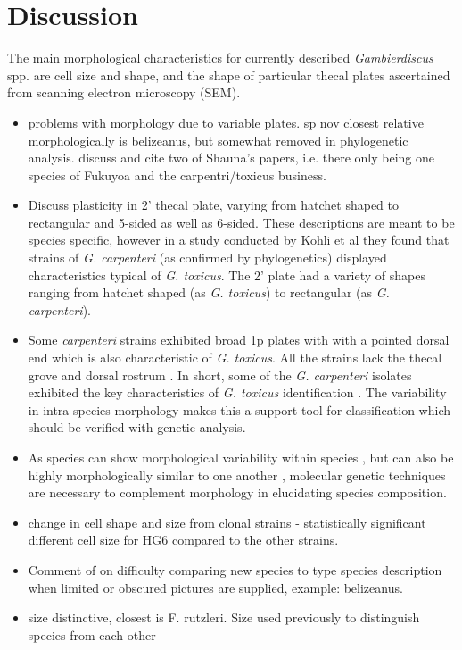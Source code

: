 \documentclass[12pt]{article}
\begin{document}
\section{Discussion}
The main morphological characteristics for currently described \emph{Gambierdiscus} spp. are cell size and shape, and the shape of particular thecal plates ascertained from scanning electron microscopy (SEM).
\begin{itemize}
\item problems with morphology due to variable plates. sp nov closest relative morphologically is belizeanus, but somewhat removed in phylogenetic analysis. discuss and cite two of Shauna's papers, i.e. there only being one species of Fukuyoa and the carpentri/toxicus business. 

\item Discuss plasticity in 2' thecal plate, varying from hatchet shaped to rectangular and 5-sided as well as 6-sided.
These descriptions are meant to be species specific, however in a study conducted by Kohli et al they found that strains of \emph{G. carpenteri} (as confirmed by phylogenetics) displayed characteristics typical of \emph{G. toxicus}. The 2' plate had a variety of shapes ranging from hatchet shaped (as \emph{G. toxicus}) to rectangular (as \emph{G. carpenteri}). 

\item Some \emph{carpenteri} strains exhibited broad 1p plates with with a pointed dorsal end which is also characteristic of \emph{G. toxicus}. All the strains lack the thecal grove and  dorsal rostrum \cite{litaker2009taxonomy}. In short, some of the \emph{G. carpenteri} isolates exhibited the key characteristics of \emph{G. toxicus} identification \cite{kohli2014high}.
The variability in intra-species morphology makes this a support tool for classification which should be verified with genetic analysis.

\item  As species can show morphological variability within species \cite{bravo2014cellular}, but can also be highly morphologically similar to one another \cite{kohli2014high}, molecular genetic techniques are necessary to complement morphology in elucidating species composition.

\item change in cell shape and size from clonal strains \cite{bravo2014cellular} - statistically significant different cell size for HG6 compared to the other strains.


\item Comment of on difficulty comparing new species to type species description when limited or obscured pictures are supplied, example: belizeanus.

\item size distinctive, closest is F. rutzleri. Size used previously to distinguish species from each other
\end{itemize}
\end{document}
